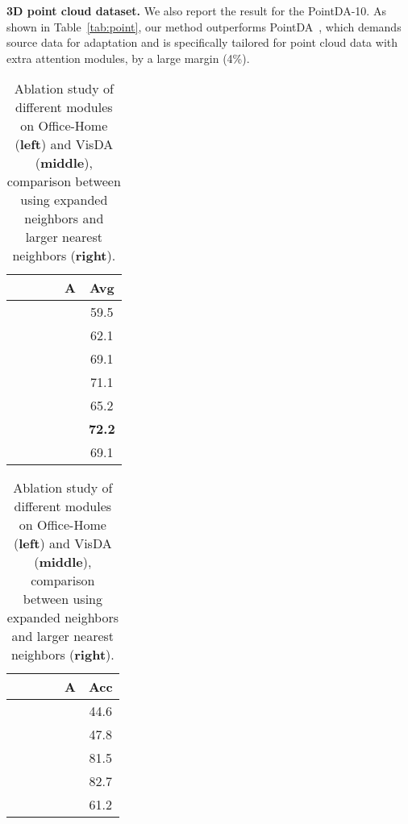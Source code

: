 \documentclass{article}
\newcommand{\cmark}{\ding{51}}\newcommand{\xmark}{\ding{55}}
\begin{document}
\noindent \textbf{3D point cloud dataset.} We also report the result for the PointDA-10. As shown in Table~\ref{tab:point}, our method outperforms  PointDA~\cite{qin2019pointdan}, which demands source data for adaptation and is specifically tailored for point cloud data with extra attention modules, by a large margin (4\%).


\begin{table}[b]
\caption{Ablation study of different modules on Office-Home (\textbf{left}) and VisDA (\textbf{middle}), comparison between using expanded neighbors and larger nearest neighbors (\textbf{right}).}\label{tab:Ablation}
\begin{minipage}[tbp]{0.35\textwidth}
\makeatletter 
\setlength{\tabcolsep}{1.mm}
\begin{tabular}{ccccc|c}
					\hline
					&&&&A& \multicolumn{1}{|c}{Avg} \\
					\hline
					& & & && \multicolumn{1}{|c}{59.5}\\
					\bm{\cmark}& & && & \multicolumn{1}{|c}{62.1}\\
					\bm{\cmark}&\bm{\cmark}& && & \multicolumn{1}{|c}{69.1}\\
					\bm{\cmark}&\bm{\cmark}&  &&\bm{\cmark}  &\multicolumn{1}{|c}{71.1}\\
					\bm{\cmark}&\bm{\cmark}& \bm{\cmark}&   &&  \multicolumn{1}{|c}{65.2}\\
					\bm{\cmark}&\bm{\cmark}& \bm{\cmark} && \bm{\cmark}& \multicolumn{1}{|c}{\textbf{72.2}}\\
					\bm{\cmark}&\bm{\cmark}&  &\bm{\cmark}& \bm{\cmark}& \multicolumn{1}{|c}{{69.1}}\\
					\hline
		\end{tabular}
\end{minipage}
	\begin{minipage}[tbp]{0.35\textwidth}
	\makeatletter 
\setlength{\tabcolsep}{1.mm}
\begin{tabular}{ccccc|c}
					\hline
					&&&&A& \multicolumn{1}{|c}{Acc} \\
					\hline
					&& & && \multicolumn{1}{|c}{44.6}\\
					\bm{\cmark}&& &  &&\multicolumn{1}{|c}{47.8}\\
					\bm{\cmark}&\bm{\cmark}&  &&  &\multicolumn{1}{|c}{81.5}\\
					\bm{\cmark}&\bm{\cmark}&  &&\bm{\cmark} &\multicolumn{1}{|c}{82.7}\\
					\bm{\cmark}&\bm{\cmark}& \bm{\cmark} &    &&\multicolumn{1}{|c}{61.2}\\

\end{tabular}
\end{minipage}
\end{table}
\end{document}
